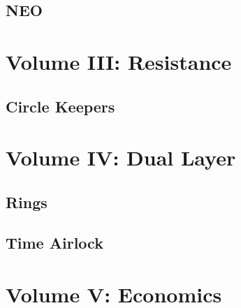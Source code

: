 \documentclass[11pt,a4paper,twoside]{book}
\begin{document}
\chapter{NEO}




\part{Volume III: Resistance}

\chapter{Circle Keepers}




\part{Volume IV: Dual Layer}

\chapter{Rings}




\chapter{Time Airlock}




\part{Volume V: Economics}
\end{document}
